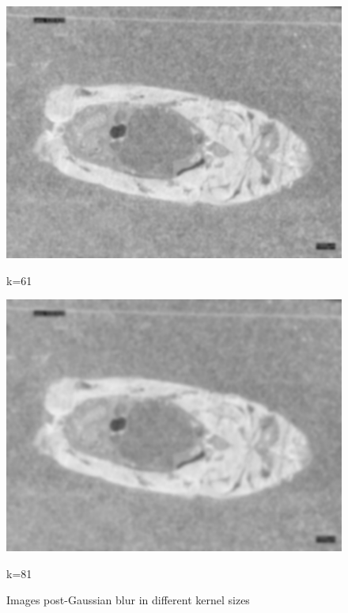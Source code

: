 \begin{figure}
\begin{minipage}{0.24\textwidth}
        \includegraphics[width=\textwidth]{./fig/gausssian/blurred61.jpg}
        \caption*{k=61}
        \label{fig:blurred61}
    \end{minipage}
    \begin{minipage}{0.24\textwidth}
        \centering
        \includegraphics[width=\textwidth]{./fig/gausssian/blurred81.jpg}
        \caption*{k=81}
        \label{fig:blurred81}
    \end{minipage}
    \caption{Images post-Gaussian blur in different kernel sizes}
    \label{fig:blurred}
\end{figure}


